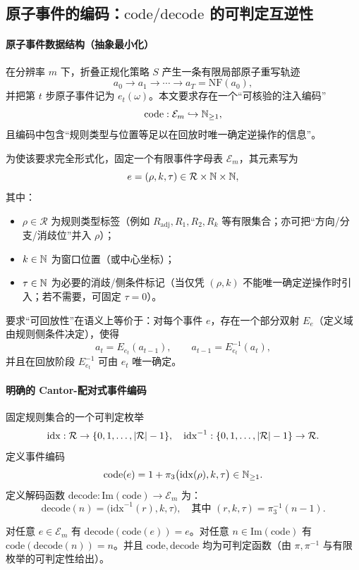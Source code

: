 \subsection{原子事件的编码：\texorpdfstring{$\mathrm{code}/\mathrm{decode}$}{code/decode} 的可判定互逆性}

\paragraph{原子事件数据结构（抽象最小化）}
在分辨率 $m$ 下，折叠正规化策略 $S$ 产生一条有限局部原子重写轨迹
$$
a_0\to a_1\to\cdots\to a_T=\mathrm{NF}(a_0),
$$
并把第 $t$ 步原子事件记为 $e_t(\omega)$。本文要求存在一个“可核验的注入编码”
$$
\mathrm{code}:\mathcal E_m\hookrightarrow \mathbb{N}_{\ge 1},
$$
且编码中包含“规则类型与位置等足以在回放时唯一确定逆操作的信息”。

为使该要求完全形式化，固定一个有限事件字母表 $\mathcal E_m$，其元素写为
$$
e=(\rho,k,\tau)\in \mathcal R\times \mathbb{N}\times \mathbb{N},
$$
其中：
\begin{itemize}
  \item $\rho\in\mathcal R$ 为规则类型标签（例如 $R_{\mathrm{adj}},R_1,R_2,R_k$ 等有限集合；亦可把“方向/分支/消歧位”并入 $\rho$）；
  \item $k\in\mathbb{N}$ 为窗口位置（或中心坐标）；
  \item $\tau\in\mathbb{N}$ 为必要的消歧/侧条件标记（当仅凭 $(\rho,k)$ 不能唯一确定逆操作时引入；若不需要，可固定 $\tau=0$）。
\end{itemize}

要求“可回放性”在语义上等价于：对每个事件 $e$，存在一个部分双射 $E_e$（定义域由规则侧条件决定），使得
$$
a_{t}=E_{e_t}(a_{t-1}),\qquad a_{t-1}=E_{e_t}^{-1}(a_{t}),
$$
并且在回放阶段 $E_{e_t}^{-1}$ 可由 $e_t$ 唯一确定。

\paragraph{明确的 Cantor-配对式事件编码}
固定规则集合的一个可判定枚举
$$
\mathrm{idx}:\mathcal R\to\{0,1,\dots,\left\lvert \mathcal R\right\rvert-1\},
\quad
\mathrm{idx}^{-1}:\{0,1,\dots,\left\lvert \mathcal R\right\rvert-1\}\to\mathcal R .
$$
定义事件编码
$$
\mathrm{code}(e)=1+\pi_3\bigl(\mathrm{idx}(\rho),k,\tau\bigr)\in\mathbb{N}_{\ge 1}.
$$
定义解码函数 $\mathrm{decode}:\mathrm{Im}(\mathrm{code})\to \mathcal E_m$ 为：
$$
\mathrm{decode}(n)=
\bigl(\mathrm{idx}^{-1}(r),k,\tau\bigr),
\quad \text{其中 } (r,k,\tau)=\pi_3^{-1}(n-1).
$$
\begin{proposition}[可判定互逆性]\label{prop:code-decode-invertible}
对任意 $e\in\mathcal E_m$ 有 $\mathrm{decode}(\mathrm{code}(e))=e$。对任意 $n\in\mathrm{Im}(\mathrm{code})$ 有 $\mathrm{code}(\mathrm{decode}(n))=n$。并且 $\mathrm{code},\mathrm{decode}$ 均为可判定函数（由 $\pi,\pi^{-1}$ 与有限枚举的可判定性给出）。
\end{proposition}

